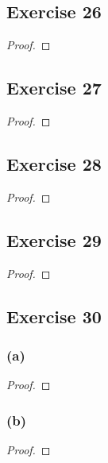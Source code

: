 \documentclass[14pt]{extarticle}
\begin{document}
\subsection{Exercise 26}

\begin{proof}

\end{proof}

\subsection{Exercise 27}

\begin{proof}

\end{proof}

\subsection{Exercise 28}

\begin{proof}

\end{proof}

\subsection{Exercise 29}

\begin{proof}

\end{proof}

\subsection{Exercise 30}

\subsubsection{(a)}

\begin{proof}

\end{proof}

\subsubsection{(b)}

\begin{proof}

\end{proof}
\end{document}
